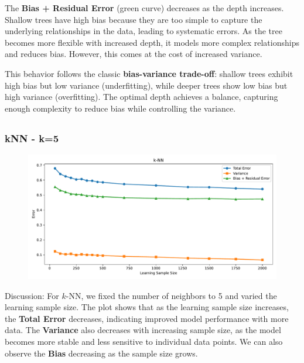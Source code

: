 \documentclass[a4paper,10pt]{article}
\begin{document}
The \textbf{Bias + Residual Error} (green curve) decreases as the depth increases. Shallow trees have high bias because they are too simple to capture the underlying relationships in the data, leading to systematic errors. As the tree becomes more flexible with increased depth, it models more complex relationships and reduces bias. However, this comes at the cost of increased variance.

This behavior follows the classic \textbf{bias-variance trade-off}: shallow trees exhibit high bias but low variance (underfitting), while deeper trees show low bias but high variance (overfitting). The optimal depth achieves a balance, capturing enough complexity to reduce bias while controlling the variance.




    

\subsection{}

\subsubsection{kNN - k=5}

\begin{figure}[H]
    \centering
    \includegraphics[width=0.8\linewidth]{images/2.4_knn.pdf}
\end{figure}

Discussion:  
For \(k\)-NN, we fixed the number of neighbors to 5 and varied the learning sample size. The plot shows that as the learning sample size increases, the \textbf{Total Error} decreases, indicating improved model performance with more data. The \textbf{Variance} also decreases with increasing sample size, as the model becomes more stable and less sensitive to individual data points. We can also observe the \textbf{Bias} decreasing as the sample size grows. 
\end{document}
